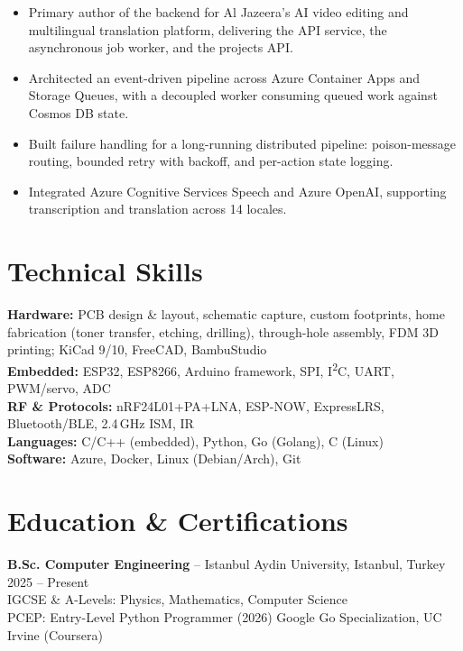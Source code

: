 \documentclass[10pt,a4paper]{article}
\begin{document}
\begin{itemize}
    \item Primary author of the backend for Al Jazeera's AI video editing and
    multilingual translation platform, delivering the API service, the
    asynchronous job worker, and the projects API.
    \item Architected an event-driven pipeline across Azure Container Apps and
    Storage Queues, with a decoupled worker consuming queued work against
    Cosmos DB state.
    \item Built failure handling for a long-running distributed pipeline:
    poison-message routing, bounded retry with backoff, and per-action state logging.
    \item Integrated Azure Cognitive Services Speech and Azure OpenAI, supporting
    transcription and translation across 14 locales.
\end{itemize}

\section*{Technical Skills}
\textbf{Hardware:} PCB design \& layout, schematic capture, custom footprints, home fabrication (toner transfer, etching, drilling), through-hole assembly, FDM 3D printing; KiCad 9/10, FreeCAD, BambuStudio\\
\textbf{Embedded:} ESP32, ESP8266, Arduino framework, SPI, I\textsuperscript{2}C, UART, PWM/servo, ADC\\
\textbf{RF \& Protocols:} nRF24L01+PA+LNA, ESP-NOW, ExpressLRS, Bluetooth/BLE, 2.4\,GHz ISM, IR\\
\textbf{Languages:} C/C++ (embedded), Python, Go (Golang), C (Linux)\\
\textbf{Software:} Azure, Docker, Linux (Debian/Arch), Git

\section*{Education \& Certifications}
\textbf{B.Sc. Computer Engineering} -- Istanbul Aydin University, Istanbul, Turkey \hfill 2025 -- Present\\
IGCSE \& A-Levels: Physics, Mathematics, Computer Science\\
PCEP: Entry-Level Python Programmer (2026) \textbar{} Google Go Specialization, UC Irvine (Coursera)
\end{document}
